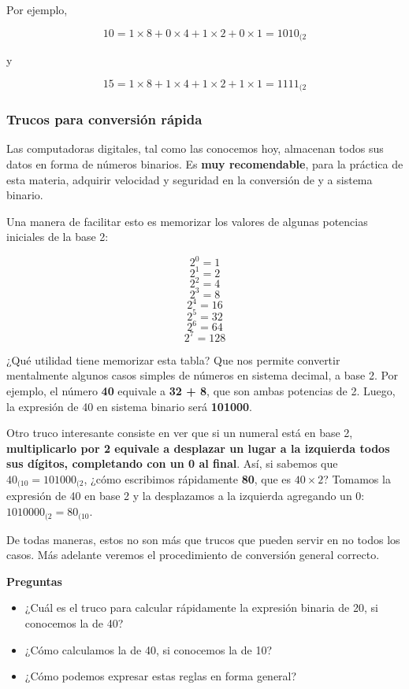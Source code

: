 \documentclass[spanish,a4paper,]{article}
\providecommand{\tightlist}{%
  \setlength{\itemsep}{0pt}\setlength{\parskip}{0pt}}
\begin{document}
Por ejemplo,

\[10 = 1\times8 + 0\times4 + 1\times2 + 0\times1 = 1010_{(2}\]

y

\[15 = 1\times8 + 1\times4 + 1\times2 + 1\times1 = 1111_{(2}\]

\hypertarget{trucos-para-conversiuxf3n-ruxe1pida}{%
\subsubsection{Trucos para conversión
rápida}\label{trucos-para-conversiuxf3n-ruxe1pida}}

Las computadoras digitales, tal como las conocemos hoy, almacenan todos
sus datos en forma de números binarios. Es \textbf{muy recomendable},
para la práctica de esta materia, adquirir velocidad y seguridad en la
conversión de y a sistema binario.

Una manera de facilitar esto es memorizar los valores de algunas
potencias iniciales de la base 2:

\[2^0 = 1\] \[2^1 = 2\] \[2^2 = 4\] \[2^3 = 8\] \[2^4 = 16\]
\[2^5 = 32\] \[2^6 = 64\] \[2^7 = 128\]

¿Qué utilidad tiene memorizar esta tabla? Que nos permite convertir
mentalmente algunos casos simples de números en sistema decimal, a base
2. Por ejemplo, el número \textbf{40} equivale a \textbf{32 + 8}, que
son ambas potencias de 2. Luego, la expresión de 40 en sistema binario
será \textbf{101000}.

Otro truco interesante consiste en ver que si un numeral está en base 2,
\textbf{multiplicarlo por 2 equivale a desplazar un lugar a la izquierda
todos sus dígitos, completando con un 0 al final}. Así, si sabemos que
\(40_{(10} = 101000_{(2}\), ¿cómo escribimos rápidamente \textbf{80},
que es \(40\times2\)? Tomamos la expresión de 40 en base 2 y la
desplazamos a la izquierda agregando un 0: \(1010000_{(2} = 80_{(10}\).

De todas maneras, estos no son más que trucos que pueden servir en no
todos los casos. Más adelante veremos el procedimiento de conversión
general correcto.

\textbf{Preguntas}

\begin{itemize}
\tightlist
\item
  ¿Cuál es el truco para calcular rápidamente la expresión binaria de
  20, si conocemos la de 40?
\item
  ¿Cómo calculamos la de 40, si conocemos la de 10?
\item
  ¿Cómo podemos expresar estas reglas en forma general?
\end{itemize}
\end{document}
